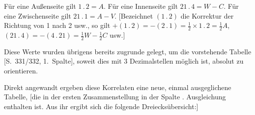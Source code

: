 \par\noindent\hspace*{\parindent}Für eine Außenseite gilt \(1\, .\,2=A\). Für eine Innenseite gilt \(21\, .\,4=W-C\). Für
eine Zwischenseite gilt \(21\, .\,1=A-V\). [Bezeichnet \((1\, .\,2)\) die Korrektur der
Richtung von 1 nach 2 usw., so gilt \(+(1\, .\,2)=-(2\, .\,1)=\frac12\times1\, .\,2=\frac12A\),
\((21\, .\,4)=-(4\, .\,21)=\frac12W-\frac12C\) usw.]

\par\noindent\hspace*{\parindent}Diese Werte wurden übrigens bereits zugrunde gelegt, um die vorstehende
Tabelle [S.\ 331/332, 1.\ Spalte], soweit dies mit 3 Dezimalstellen möglich ist,
absolut zu orientieren.

\par\noindent\hspace*{\parindent}Direkt angewandt ergeben diese Korrelaten eine neue, einmal ausgeglichene Tabelle,
[die in der ersten Zusammenstellung in der Spalte . Ausgleichung\guillemotleft{}
enthalten ist. Aus ihr ergibt sich die folgende Dreiecksübersicht:]
